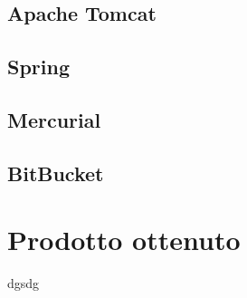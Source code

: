 \subsection{Apache Tomcat}
\subsection{Spring}
\subsection{Mercurial}

\subsection{BitBucket}
\section{Prodotto ottenuto}

dgsdg
